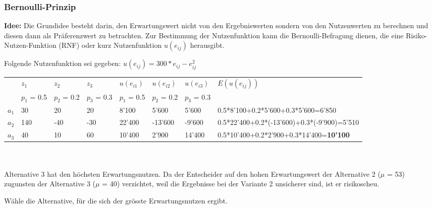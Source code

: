 \subsubsection{Bernoulli-Prinzip}
\textbf{Idee:} Die Grundidee besteht darin, den Erwartungswert nicht von den Ergebniswerten sondern von den Nutzenwerten zu berechnen und diesen dann als Präferenzwert zu betrachten. Zur Bestimmung der Nutzenfunktion kann die Bernoulli-Befragung
dienen, die eine Risiko-Nutzen-Funktion (RNF) oder kurz Nutzenfunktion $u(e_{ij})$ herausgibt.
\begin{example}
	Folgende Nutzenfunktion sei gegeben: $u(e_{ij}) = 300 * e_{ij} - e_{ij}^2$ \\
	\begin{tabular}{|l|l|l|l||l|l|l||l|}
		\hline
		& $z_1$ & $z_2$ & $z_3$ & $u(e_{i1})$ & $u(e_{i2})$ & $u(e_{i3})$ & $E(u(e_{ij}))$ \\
		& $p_1$ = 0.5 & $p_2$ = 0.2 & $p_3$ = 0.3 & $p_1$ = 0.5 & $p_2$ = 0.2 & $p_3$ = 0.3 & \\ \hline
		$a_1$ & 30 & 20 & 20 & 8'100 & 5'600 & 5'600 & 0.5*8'100+0.2*5'600+0.3*5'600=6'850\\ \hline
		$a_2$ & 140 & -40 & -30 & 22'400 & -13'600 & -9'600 & 0.5*22'400+0.2*(-13'600)+0.3*(-9'900)=5'510\\ \hline
		$a_3$ & 40 & 10 & 60 & 10'400 & 2'900 & 14'400 & 0.5*10'400+0.2*2'900+0.3*14'400=\textbf{10'100}\\ \hline
	\end{tabular} \\ \ \\
	Alternative 3 hat den höchsten Erwartungsnutzen. Da der Entscheider auf den hohen Erwartungswert der Alternative 2 ($\mu$  = 53) zugunsten der Alternative 3 ($\mu$ = 40) verzichtet, weil die Ergebnisse bei der Variante 2 unsicherer sind, ist er risikoscheu.
\end{example}
Wähle die Alternative, für die sich der grösste Erwartungsnutzen ergibt.
